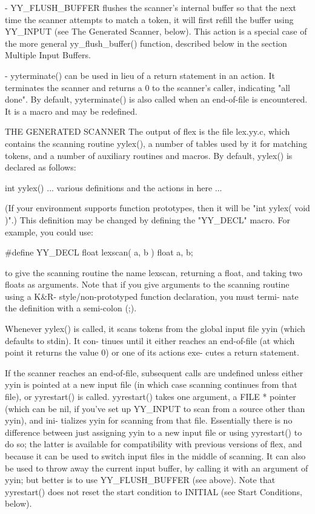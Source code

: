\documentclass[12pt,spanish,twocolumn,lettersize]{article}
\begin{document}
       -      YY_FLUSH_BUFFER	flushes	 the  scanner's	 internal
	      buffer so that the next time the	scanner	 attempts
	      to  match	 a token, it will first refill the buffer
	      using YY_INPUT (see The Generated Scanner,  below).
	      This  action  is a special case of the more general
	      yy_flush_buffer() function, described below in  the
	      section Multiple Input Buffers.

       -      yyterminate()  can  be  used  in	lieu  of a return
	      statement in an action.  It terminates the  scanner
	      and returns a 0 to the scanner's caller, indicating
	      "all done".   By	default,  yyterminate()	 is  also
	      called when an end-of-file is encountered.  It is a
	      macro and may be redefined.

THE GENERATED SCANNER
       The output of flex is the file  lex.yy.c,  which	 contains
       the  scanning  routine yylex(), a number of tables used by
       it for matching tokens, and a number of auxiliary routines
       and macros.  By default, yylex() is declared as follows:

	   int yylex()
	       {
	       ... various definitions and the actions in here ...
	       }

       (If your environment supports function prototypes, then it
       will be "int yylex( void	 )".)	This  definition  may  be
       changed by defining the "YY_DECL" macro.	 For example, you
       could use:

	   #define YY_DECL float lexscan( a, b ) float a, b;

       to give the scanning routine the name lexscan, returning a
       float,  and  taking two floats as arguments.  Note that if
       you give arguments to the scanning routine  using  a  K&R-
       style/non-prototyped function declaration, you must termi-
       nate the definition with a semi-colon (;).

       Whenever yylex() is  called,  it	 scans	tokens	from  the
       global input file yyin (which defaults to stdin).  It con-
       tinues until it either reaches an  end-of-file  (at  which
       point  it  returns the value 0) or one of its actions exe-
       cutes a return statement.

       If the scanner reaches an  end-of-file,	subsequent  calls
       are undefined unless either yyin is pointed at a new input
       file (in which case scanning continues from that file), or
       yyrestart()  is called.	yyrestart() takes one argument, a
       FILE * pointer  (which  can  be	nil,  if  you've  set  up
       YY_INPUT	 to scan from a source other than yyin), and ini-
       tializes yyin for scanning from	that  file.   Essentially
       there  is  no  difference between just assigning yyin to a
       new input file or using yyrestart() to do so;  the  latter
       is  available  for compatibility with previous versions of
       flex, and because it can be used to switch input files  in
       the middle of scanning.	It can also be used to throw away
       the current input buffer, by calling it with  an	 argument
       of yyin; but better is to use YY_FLUSH_BUFFER (see above).
       Note that yyrestart() does not reset the	 start	condition
       to INITIAL (see Start Conditions, below).
\end{document}
